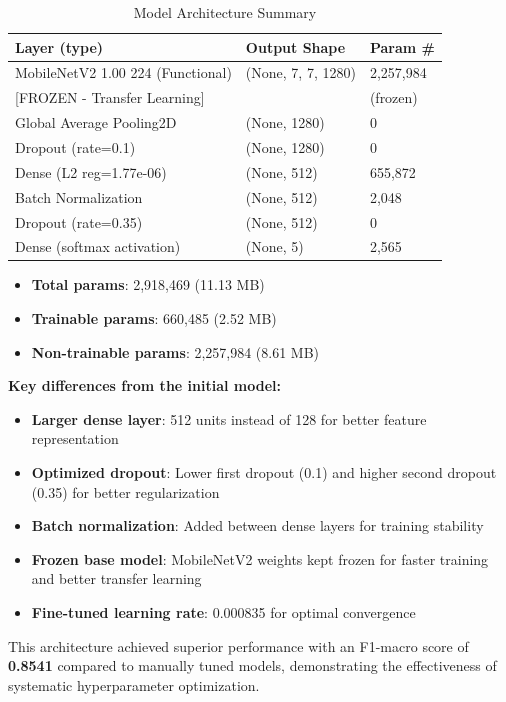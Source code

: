 \documentclass[12pt,a4paper]{article}
\begin{document}
\begin{table}[H]
\centering
\caption{Model Architecture Summary}
\begin{tabular}{@{}p{6cm}p{4cm}p{3cm}@{}}
\toprule
\textbf{Layer (type)} & \textbf{Output Shape} & \textbf{Param \#} \\
\midrule
MobileNetV2 1.00 224 (Functional) & (None, 7, 7, 1280) & 2,257,984 \\
{[}FROZEN - Transfer Learning{]} & & (frozen) \\
\midrule
Global Average Pooling2D & (None, 1280) & 0 \\
\midrule
Dropout (rate=0.1) & (None, 1280) & 0 \\
\midrule
Dense (L2 reg=1.77e-06) & (None, 512) & 655,872 \\
\midrule
Batch Normalization & (None, 512) & 2,048 \\
\midrule
Dropout (rate=0.35) & (None, 512) & 0 \\
\midrule
Dense (softmax activation) & (None, 5) & 2,565 \\
\bottomrule
\end{tabular}
\end{table}

\begin{itemize}
    \item \textbf{Total params}: 2,918,469 (11.13 MB)
    \item \textbf{Trainable params}: 660,485 (2.52 MB)
    \item \textbf{Non-trainable params}: 2,257,984 (8.61 MB)
\end{itemize}

\textbf{Key differences from the initial model:}
\begin{itemize}
    \item \textbf{Larger dense layer}: 512 units instead of 128 for better feature representation
    \item \textbf{Optimized dropout}: Lower first dropout (0.1) and higher second dropout (0.35) for better regularization
    \item \textbf{Batch normalization}: Added between dense layers for training stability
    \item \textbf{Frozen base model}: MobileNetV2 weights kept frozen for faster training and better transfer learning
    \item \textbf{Fine-tuned learning rate}: 0.000835 for optimal convergence
\end{itemize}

This architecture achieved superior performance with an F1-macro score of \textbf{0.8541} compared to manually tuned models, demonstrating the effectiveness of systematic hyperparameter optimization.
\end{document}
